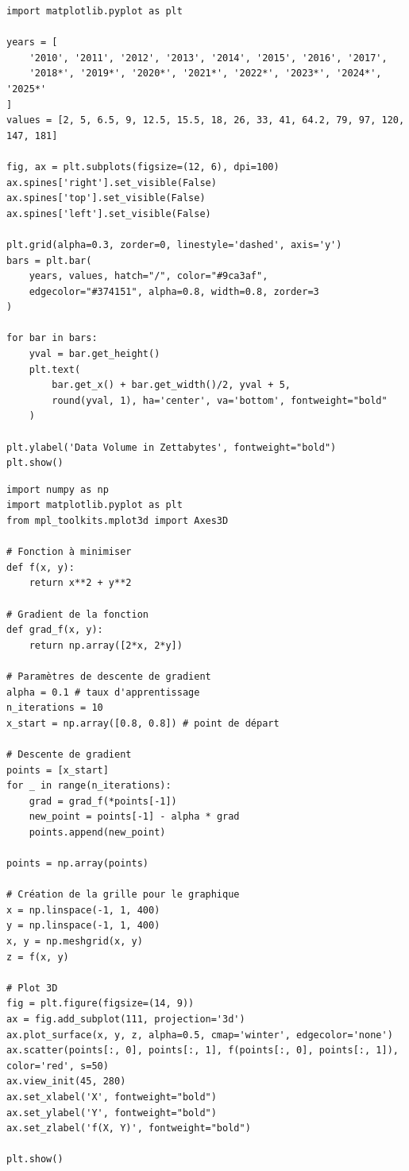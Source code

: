 \begin{listing}[!ht]
\begin{verbatim}
import matplotlib.pyplot as plt

years = [
    '2010', '2011', '2012', '2013', '2014', '2015', '2016', '2017', 
    '2018*', '2019*', '2020*', '2021*', '2022*', '2023*', '2024*', '2025*'
]
values = [2, 5, 6.5, 9, 12.5, 15.5, 18, 26, 33, 41, 64.2, 79, 97, 120, 147, 181]

fig, ax = plt.subplots(figsize=(12, 6), dpi=100)
ax.spines['right'].set_visible(False)
ax.spines['top'].set_visible(False)
ax.spines['left'].set_visible(False)

plt.grid(alpha=0.3, zorder=0, linestyle='dashed', axis='y')
bars = plt.bar(
    years, values, hatch="/", color="#9ca3af", 
    edgecolor="#374151", alpha=0.8, width=0.8, zorder=3
)

for bar in bars:
    yval = bar.get_height()
    plt.text(
        bar.get_x() + bar.get_width()/2, yval + 5, 
        round(yval, 1), ha='center', va='bottom', fontweight="bold"
    )

plt.ylabel('Data Volume in Zettabytes', fontweight="bold")
plt.show()
\end{verbatim}
\caption{Code python utilisé pour générer la figure \ref{fig:datagenerated}}
\label{appendix:code:python:plot-generation}
\end{listing}

\begin{listing}[!ht]
\begin{verbatim}
import numpy as np
import matplotlib.pyplot as plt
from mpl_toolkits.mplot3d import Axes3D

# Fonction à minimiser
def f(x, y):
    return x**2 + y**2

# Gradient de la fonction
def grad_f(x, y):
    return np.array([2*x, 2*y])

# Paramètres de descente de gradient
alpha = 0.1 # taux d'apprentissage
n_iterations = 10
x_start = np.array([0.8, 0.8]) # point de départ

# Descente de gradient
points = [x_start]
for _ in range(n_iterations):
    grad = grad_f(*points[-1])
    new_point = points[-1] - alpha * grad
    points.append(new_point)

points = np.array(points)

# Création de la grille pour le graphique
x = np.linspace(-1, 1, 400)
y = np.linspace(-1, 1, 400)
x, y = np.meshgrid(x, y)
z = f(x, y)

# Plot 3D
fig = plt.figure(figsize=(14, 9))
ax = fig.add_subplot(111, projection='3d')
ax.plot_surface(x, y, z, alpha=0.5, cmap='winter', edgecolor='none')
ax.scatter(points[:, 0], points[:, 1], f(points[:, 0], points[:, 1]), color='red', s=50)
ax.view_init(45, 280)
ax.set_xlabel('X', fontweight="bold")
ax.set_ylabel('Y', fontweight="bold")
ax.set_zlabel('f(X, Y)', fontweight="bold")

plt.show()
\end{verbatim}
\caption{Code python utilisé pour générer la figure \ref{fig:gradient-descent}}
\label{appendix:code:python:gd}
\end{listing}


